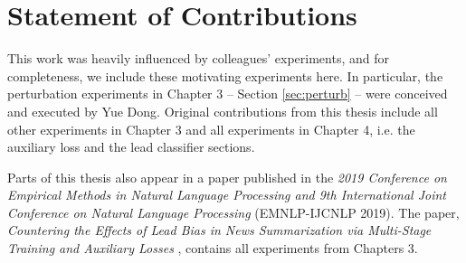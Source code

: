 \section{Statement of Contributions}
This work was heavily influenced by colleagues' experiments, and for completeness, we include these motivating experiments here. In particular, the perturbation experiments in Chapter 3 -- Section \ref{sec:perturb} -- were conceived and executed by Yue Dong.
Original contributions from this thesis include all other experiments in Chapter 3 and all experiments in Chapter 4, i.e. the auxiliary loss and the lead classifier sections.

Parts of this thesis also appear in a paper published in the \textit{2019 Conference on Empirical Methods in Natural Language Processing and 9th International Joint Conference on Natural Language Processing} (EMNLP-IJCNLP 2019). The paper, \textit{Countering the Effects of Lead Bias in News Summarization via Multi-Stage Training and Auxiliary Losses} \parencite{grenander-etal-2019-countering}, contains all experiments from Chapters 3.